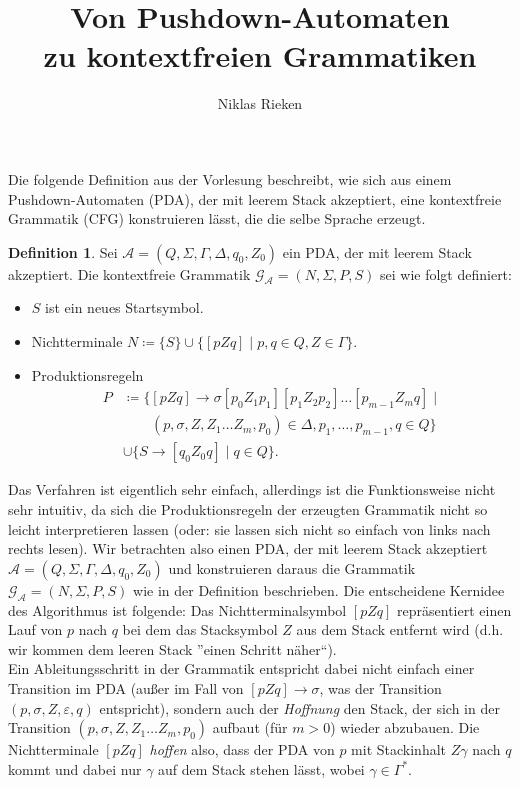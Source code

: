 \documentclass[11pt, a4paper]{article}
\author{Niklas Rieken}
\title{Von Pushdown-Automaten\\zu kontextfreien Grammatiken}
\theoremstyle{definition}
\newtheorem*{definition*}{Definition}
\theoremstyle{plain}
\begin{document}
\maketitle
Die folgende Definition aus der Vorlesung beschreibt, wie sich aus einem Pushdown-Automaten (PDA), der mit leerem Stack akzeptiert, eine kontextfreie Grammatik (CFG) konstruieren lässt, die die selbe Sprache erzeugt. 
\begin{definition*}
	Sei $\mathcal{A} = (Q, \Sigma, \Gamma, \Delta, q_0, Z_0)$ ein PDA, der mit leerem Stack akzeptiert. Die kontextfreie Grammatik $\mathcal{G}_\mathcal{A} = (N, \Sigma, P, S)$ sei wie folgt definiert:
	\begin{itemize}
		\item $S$ ist ein neues Startsymbol.
		\item Nichtterminale $N \coloneqq \{S\} \cup \{[pZq] \mid p, q\in Q, Z \in \Gamma\}$.
		\item Produktionsregeln
			\begin{align*}
				P &\coloneqq \{[pZq] \to \sigma [p_0Z_1p_1][p_1Z_2p_2]\ldots[p_{m-1}Z_mq] \mid\\
				&\quad\quad (p, \sigma, Z, Z_1 \ldots Z_m, p_0) \in \Delta, p_1, \ldots, p_{m-1}, q \in Q\}\\
				&\cup \{S \to [q_0Z_0q] \mid q \in Q\}.
			\end{align*}
	\end{itemize}
\end{definition*}
Das Verfahren ist eigentlich sehr einfach, allerdings ist die Funktionsweise nicht sehr intuitiv, da sich die Produktionsregeln der erzeugten Grammatik nicht so leicht interpretieren lassen (oder: sie lassen sich nicht so einfach von links nach rechts lesen).
Wir betrachten also einen PDA, der mit leerem Stack akzeptiert $\mathcal{A} = (Q, \Sigma, \Gamma, \Delta, q_0, Z_0)$ und konstruieren daraus die Grammatik $\mathcal{G_A} = (N, \Sigma, P, S)$ wie in der Definition beschrieben. Die entscheidene Kernidee des Algorithmus ist folgende: Das Nichtterminalsymbol $[pZq]$ repräsentiert einen Lauf von $p$ nach $q$ bei dem das Stacksymbol $Z$ aus dem Stack entfernt wird (d.h. wir kommen dem leeren Stack ''einen Schritt näher``).\\
Ein Ableitungsschritt in der Grammatik entspricht dabei nicht einfach einer Transition im PDA (außer im Fall von $[pZq] \to \sigma$, was der Transition $(p, \sigma, Z, \varepsilon, q)$ entspricht), sondern auch der \textit{Hoffnung} den Stack, der sich in der Transition $(p, \sigma, Z, Z_1 \ldots Z_m, p_0)$ aufbaut (für $m > 0$) wieder abzubauen. Die Nichtterminale $[pZq]$ \textit{hoffen} also, dass der PDA von $p$ mit Stackinhalt $Z\gamma$ nach $q$ kommt und dabei nur $\gamma$ auf dem Stack stehen lässt, wobei $\gamma \in \Gamma^\ast$. 
\end{document}
